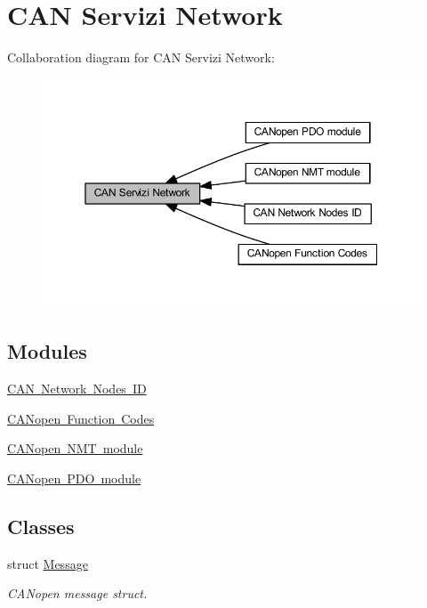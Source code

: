 \hypertarget{group___c_a_n__network__module}{}\section{C\+AN Servizi Network}
\label{group___c_a_n__network__module}
Collaboration diagram for C\+AN Servizi Network\+:\nopagebreak
\begin{figure}[H]
\begin{center}
\leavevmode
\includegraphics[width=350pt]{group___c_a_n__network__module}
\end{center}
\end{figure}
\subsection*{Modules}
\begin{DoxyCompactItemize}
\item 
\mbox{\hyperlink{group___c_a_n___i_d}{C\+A\+N Network Nodes ID}}
\item 
\mbox{\hyperlink{group___c_a_nopen___func___codes}{C\+A\+Nopen Function Codes}}
\item 
\mbox{\hyperlink{group___c_a_nopen___n_m_t__group}{C\+A\+Nopen N\+M\+T module}}
\item 
\mbox{\hyperlink{group___c_a_nopen___p_d_o__module}{C\+A\+Nopen P\+D\+O module}}
\end{DoxyCompactItemize}
\subsection*{Classes}
\begin{DoxyCompactItemize}
\item 
struct \mbox{\hyperlink{struct_message}{Message}}
\begin{DoxyCompactList}\small\item\em C\+A\+Nopen message struct. \end{DoxyCompactList}\end{DoxyCompactItemize}
